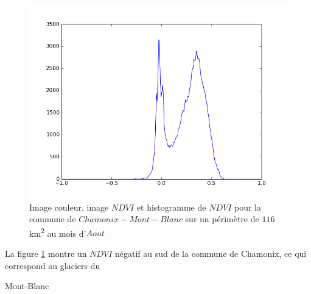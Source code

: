 \documentclass{book}
\begin{document}
\begin{figure}[H]
{}
\begin{center}
\includegraphics[scale=0.45]{images/Chamonix/08_ndvi_histo.png}
\end{center}
\caption{Image couleur, image $NDVI$ et histogramme de $NDVI$ pour la commune de $Chamonix-Mont-Blanc$ sur un périmètre de $116$km\textsuperscript{2} au mois d'$Aout$}
\label{chamonix_ndvi}
\end{figure}

La figure \ref{chamonix_ndvi} montre un $NDVI$ négatif au sud de la commune de Chamonix, ce qui correspond au glaciers du \begin{itshape}Mont-Blanc\end{itshape}\\

\clearpage 
\end{document}
